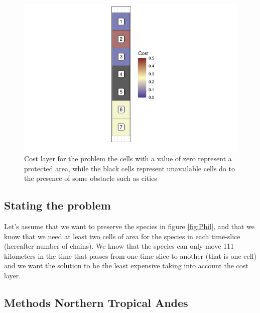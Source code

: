 \documentclass[]{article}
\begin{document}
\begin{figure}
\centering
\includegraphics{TagetBasedNew_files/figure-latex/PhilCost-1.pdf}
\caption{\label{fig:PhilCost}Cost layer for the problem the cells with a value of zero represent a protected area, while the black cells represent unavailable cells do to the presence of some obstacle such as cities}
\end{figure}

\hypertarget{stating-the-problem}{%
\subsection{Stating the problem}\label{stating-the-problem}}

Let's assume that we want to preserve the species in figure \ref{fig:Phil}, and that we know that we need at least two cells of area for the species in each time-slice (hereafter number of chains). We know that the species can only move 111 kilometers in the time that passes from one time slice to another (that is one cell) and we want the solution to be the least expensive taking into account the cost layer.

\hypertarget{methods-northern-tropical-andes}{%
\subsection{Methods Northern Tropical Andes}\label{methods-northern-tropical-andes}}
\end{document}
